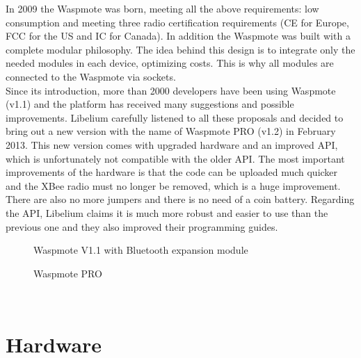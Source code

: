 In 2009 the Waspmote was born, meeting all the above requirements: low consumption and meeting three radio certification requirements (CE for Europe, FCC for the US and IC for Canada). In addition the Waspmote was built with a complete modular philosophy. The idea behind this design is to integrate only the needed modules in each device, optimizing costs. This is why all modules are connected to the Waspmote via sockets.\\Since its introduction, more than 2000 developers have been using Waspmote (v1.1) and the platform has received many suggestions and possible improvements. Libelium carefully listened to all these proposals and decided to bring out a new version with the name of Waspmote PRO (v1.2) in February 2013. This new version comes with upgraded hardware and an improved API, which is unfortunately not compatible with the older API. The most important improvements of the hardware is that the code can be uploaded much quicker and the XBee radio must no longer be removed, which is a huge improvement. There are also no more jumpers and there is no need of a coin battery. Regarding the API, Libelium claims it is much more robust and easier to use than the previous one and they also improved their programming guides. 
\begin{figure}[ht]
  \hfill
  \begin{minipage}[t]{.45\textwidth}
    \begin{center}  
      \caption{Waspmote V1.1 with Bluetooth expansion module }
      \label{fig:arduinoShield}
    \end{center}
  \end{minipage}
  \hfill
  \begin{minipage}[t]{.45\textwidth}
    \begin{center}  
      \caption{Waspmote PRO}
      \label{fig:squidbee}
    \end{center}
  \end{minipage}
  \hfill
\end{figure}\\   
\section{Hardware}
